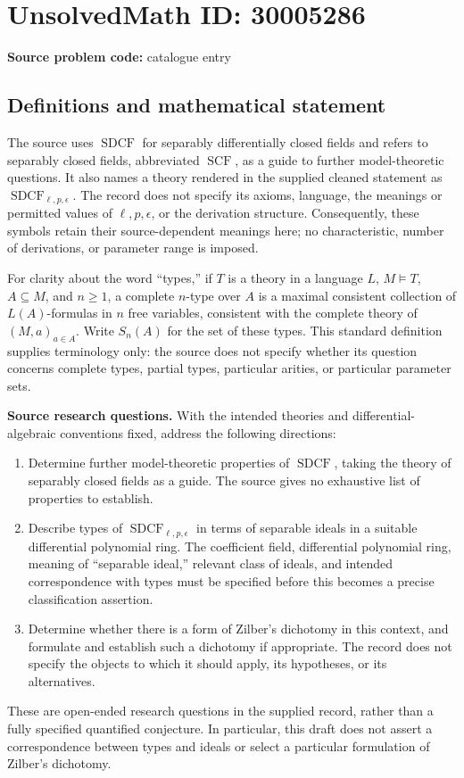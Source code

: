 \documentclass[11pt]{article}
\begin{document}
\section*{UnsolvedMath ID: 30005286}
\textbf{Source problem code:} catalogue entry
\subsection{Definitions and mathematical statement}
The source uses \(\operatorname{SDCF}\) for separably differentially closed fields and refers to separably closed fields, abbreviated \(\operatorname{SCF}\), as a guide to further model-theoretic questions. It also names a theory rendered in the supplied cleaned statement as \(\operatorname{SDCF}_{\ell,p,\epsilon}\). The record does not specify its axioms, language, the meanings or permitted values of \(\ell,p,\epsilon\), or the derivation structure. Consequently, these symbols retain their source-dependent meanings here; no characteristic, number of derivations, or parameter range is imposed.

For clarity about the word ``types,'' if \(T\) is a theory in a language \(L\), \(M\models T\), \(A\subseteq M\), and \(n\geq 1\), a complete \(n\)-type over \(A\) is a maximal consistent collection of \(L(A)\)-formulas in \(n\) free variables, consistent with the complete theory of \((M,a)_{a\in A}\). Write \(S_n(A)\) for the set of these types. This standard definition supplies terminology only: the source does not specify whether its question concerns complete types, partial types, particular arities, or particular parameter sets.

\textbf{Source research questions.} With the intended theories and differential-algebraic conventions fixed, address the following directions:
\begin{enumerate}
\item Determine further model-theoretic properties of \(\operatorname{SDCF}\), taking the theory of separably closed fields as a guide. The source gives no exhaustive list of properties to establish.
\item Describe types of \(\operatorname{SDCF}_{\ell,p,\epsilon}\) in terms of separable ideals in a suitable differential polynomial ring. The coefficient field, differential polynomial ring, meaning of ``separable ideal,'' relevant class of ideals, and intended correspondence with types must be specified before this becomes a precise classification assertion.
\item Determine whether there is a form of Zilber's dichotomy in this context, and formulate and establish such a dichotomy if appropriate. The record does not specify the objects to which it should apply, its hypotheses, or its alternatives.
\end{enumerate}
These are open-ended research questions in the supplied record, rather than a fully specified quantified conjecture. In particular, this draft does not assert a correspondence between types and ideals or select a particular formulation of Zilber's dichotomy.
\end{document}
